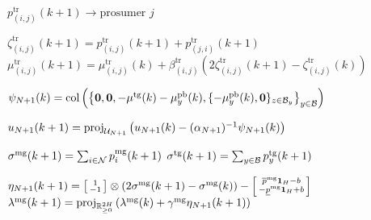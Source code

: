 \begin{algorithm*}[htbp]
\begin{algorithmic}[1]
\State
 $p^{\text{tr}}_{(i,j)}(k+1)
	\longrightarrow \text{prosumer }j$
	\EndFor
\EndComm


\Dual{ }
\State
$\zeta^{\text{tr}}_{(i,j)}(k+1)  =  p^{\textrm{tr}}_{(i,j)} (k+1) + p^{\textrm{tr}}_{(j,i)} (k+1)$
\State
$\mu^{\text{tr}}_{(i,j)}(k+1) = \mu^{\text{tr}}_{(i,j)}(k) + \beta_{(i,j)}^{\text{tr}} \left( 
	2  \zeta^{\text{tr}}_{(i,j)}(k+1) - \zeta^{\text{tr}}_{(i,j)}(k)
	\right)$
\EndFor

\EndDual

\EndPRO

\EndFor

\smallskip
\DNO{ }

\Primal{}
\State
$\psi_{N+1}(k) = \operatorname{col} \left( 
	\left\{
	\mathbf{0},\mathbf{0},-\mu^{\text{tg}}(k) - \mu_y^{\text{pb}}(k), 
	\{ -\mu_y^{\text{pb}}(k), \mathbf{0} \}_{z \in \mathcal B_y}
	\right\}_{y \in \mathcal B}
	\right)$

\State 	$u_{N+1}(k+1) = \mathrm{proj}_{\mathcal U_{N+1}}  \left( u_{N+1}(k) - (\alpha_{N+1})^{-1} \psi_{N+1}(k) \right)$
\EndPrimal

\Agg{}
\State
$ \sigma^{\text{mg}}(k+1) = \sum_{i \in \mathcal N} p_i^{\text{mg}}(k+1) $
\State
$\sigma^{\text{tg}}(k+1) = \sum_{y \in \mathcal B} p_y^{\text{tg}}(k+1)$
\EndAgg

\Dual{}
\State
$\eta_{N+1}(k+1	) = 
	\left[
	\begin{smallmatrix}
	1\\
	- 1 
	\end{smallmatrix}
	\right] \otimes (2 \sigma^{\text{mg}}(k+1)- \sigma^{\text{mg}}(k)) 
	-
	\left[
	\begin{smallmatrix}
	\overline{p}^{\mathrm{mg}}\mathbf{1}_{H}-b \\
	-     \underline{p}^{\mathrm{mg}} \mathbf{1}_{H}+b
	\end{smallmatrix} 
	\right]  $
	\State
$\lambda^{\text{mg}}(k+1) = \textstyle
	\mathrm{proj}_{\mathbb R^{2 H}_{\geq 0}}\left( 
	\lambda^{\text{mg}}(k) + \gamma^{\text{mg}} \eta_{N+1}(k+1)
	 \right)$



\end{algorithmic}
\end{algorithm*}
